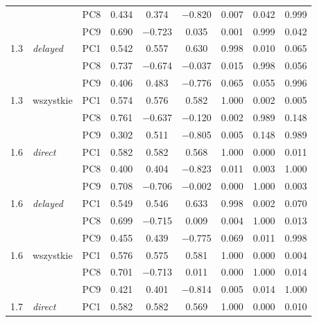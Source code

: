 \documentclass[12pt,a4paper]{article}
\begin{document}
\begin{table}[!h]
\begin{tabular}{c l c ccc ccc}
 &  & PC8 & \num{0.434} & \num{0.374} & \num{-0.820} & \num{0.007} & \num{0.042} & \num{0.999} \\
 &  & PC9 & \num{0.690} & \num{-0.723} & \num{0.035} & \num{0.001} & \num{0.999} & \num{0.042} \\
\midrule
\num{1.3} & \emph{delayed} & PC1 & \num{0.542} & \num{0.557} & \num{0.630} & \num{0.998} & \num{0.010} & \num{0.065} \\
 &  & PC8 & \num{0.737} & \num{-0.674} & \num{-0.037} & \num{0.015} & \num{0.998} & \num{0.056} \\
 &  & PC9 & \num{0.406} & \num{0.483} & \num{-0.776} & \num{0.065} & \num{0.055} & \num{0.996} \\
\midrule
\num{1.3} & wszystkie & PC1 & \num{0.574} & \num{0.576} & \num{0.582} & \num{1.000} & \num{0.002} & \num{0.005} \\
 &  & PC8 & \num{0.761} & \num{-0.637} & \num{-0.120} & \num{0.002} & \num{0.989} & \num{0.148} \\
 &  & PC9 & \num{0.302} & \num{0.511} & \num{-0.805} & \num{0.005} & \num{0.148} & \num{0.989} \\
\midrule
\num{1.6} & \emph{direct} & PC1 & \num{0.582} & \num{0.582} & \num{0.568} & \num{1.000} & \num{0.000} & \num{0.011} \\
 &  & PC8 & \num{0.400} & \num{0.404} & \num{-0.823} & \num{0.011} & \num{0.003} & \num{1.000} \\
 &  & PC9 & \num{0.708} & \num{-0.706} & \num{-0.002} & \num{0.000} & \num{1.000} & \num{0.003} \\
\midrule
\num{1.6} & \emph{delayed} & PC1 & \num{0.549} & \num{0.546} & \num{0.633} & \num{0.998} & \num{0.002} & \num{0.070} \\
 &  & PC8 & \num{0.699} & \num{-0.715} & \num{0.009} & \num{0.004} & \num{1.000} & \num{0.013} \\
 &  & PC9 & \num{0.455} & \num{0.439} & \num{-0.775} & \num{0.069} & \num{0.011} & \num{0.998} \\
\midrule
\num{1.6} & wszystkie & PC1 & \num{0.576} & \num{0.575} & \num{0.581} & \num{1.000} & \num{0.000} & \num{0.004} \\
 &  & PC8 & \num{0.701} & \num{-0.713} & \num{0.011} & \num{0.000} & \num{1.000} & \num{0.014} \\
 &  & PC9 & \num{0.421} & \num{0.401} & \num{-0.814} & \num{0.005} & \num{0.014} & \num{1.000} \\
\midrule
\num{1.7} & \emph{direct} & PC1 & \num{0.582} & \num{0.582} & \num{0.569} & \num{1.000} & \num{0.000} & \num{0.010} \\

\end{tabular}
\end{table}
\end{document}
